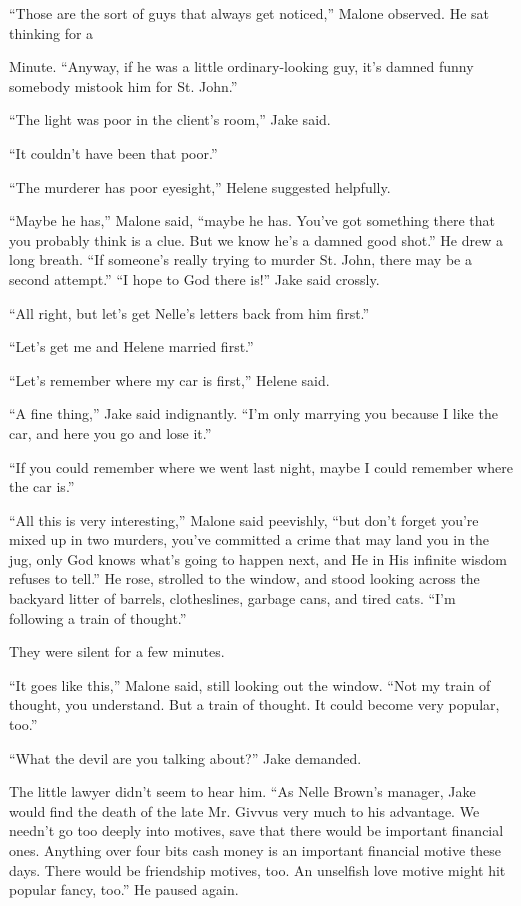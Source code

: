 \documentclass{novel}
\begin{document}
“Those are the sort of guys that always get noticed,” Malone observed. He sat thinking for a

Minute. “Anyway, if he was a little ordinary-looking guy, it’s damned funny somebody mistook him for St. John.”

“The light was poor in the client’s room,” Jake said.

“It couldn’t have been that poor.”

“The murderer has poor eyesight,” Helene suggested helpfully.

“Maybe he has,” Malone said, “maybe he has. You’ve got something there that you probably think is a clue. But we know he’s a damned good shot.” He drew a long breath. “If someone’s really trying to murder St. John, there may be a second attempt.” “I hope to God there is!” Jake said crossly.

“All right, but let’s get Nelle’s letters back from him first.”

“Let’s get me and Helene married first.”

“Let’s remember where my car is first,” Helene said.

“A fine thing,” Jake said indignantly. “I’m only marrying you because I like the car, and here you go and lose it.”

“If you could remember where we went last night, maybe I could remember where the car is.”

“All this is very interesting,” Malone said peevishly, “but don’t forget you’re mixed up in two murders, you’ve committed a crime that may land you in the jug, only God knows what’s going to happen next, and He in His infinite wisdom refuses to tell.” He rose, strolled to the window, and stood looking across the backyard litter of barrels, clotheslines, garbage cans, and tired cats. “I’m following a train of thought.”

They were silent for a few minutes.

“It goes like this,” Malone said, still looking out the window. “Not my train of thought, you understand. But a train of thought. It could become very popular, too.”

“What the devil are you talking about?” Jake demanded.

The little lawyer didn’t seem to hear him. “As Nelle Brown’s manager, Jake would find the death of the late Mr. Givvus very much to his advantage. We needn’t go too deeply into motives, save that there would be important financial ones. Anything over four bits cash money is an important financial motive these days. There would be friendship motives, too. An unselfish love motive might hit popular fancy, too.” He paused again.
\end{document}
